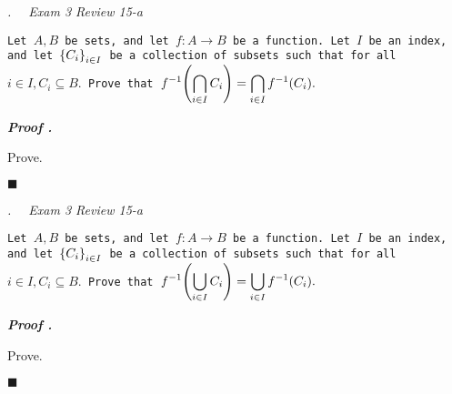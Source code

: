 \documentclass[11pt,letter]{article}
\newcounter{nq}[section]
\newcounter{np}[section]
\newenvironment*{p}{\par\noindent\textbf{\textit{Proof \stepcounter{np}\thenp. }}\par}{\par\hfill $\blacksquare$\par}
\newenvironment*{q}[1]{\noindent\emph{\thesection.\stepcounter{nq}\thenq$\quad $ #1}\par\noindent\texttt}{}
\def\dsst{\displaystyle}
\def\f{f^{-1}}
\begin{document}
\begin{framed}\begin{q}
	{Exam 3 Review 15-a}
	{Let $A,B$ be sets, and let $f:A\to B$ be a function. Let $I$ be an index, and let $\qty{C_i}_{i\in I}$ be a collection of subsets such that for all $i\in I,C_i\subseteq B.$ Prove that $\dsst\f\qty(\bigcap_{i\in I}C_i)=\bigcap_{i\in I}\f(C_i).$}
\end{q}\end{framed}
\begin{p}
	Prove.	
\end{p}

\begin{framed}\begin{q}
	{Exam 3 Review 15-a}
	{Let $A,B$ be sets, and let $f:A\to B$ be a function. Let $I$ be an index, and let $\qty{C_i}_{i\in I}$ be a collection of subsets such that for all $i\in I,C_i\subseteq B.$ Prove that $\dsst\f\qty(\bigcup_{i\in I}C_i)=\bigcup_{i\in I}\f(C_i).$}
\end{q}\end{framed}
\begin{p}
	Prove.	
\end{p}

\label{LastPage}
\end{document}
